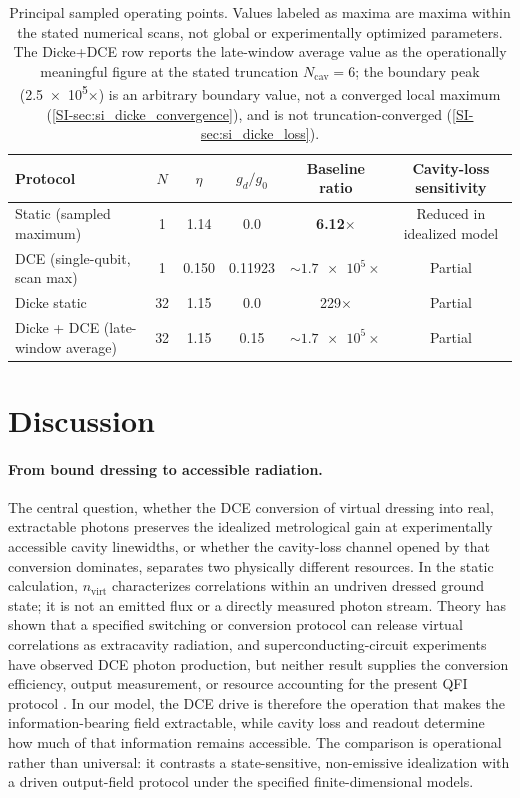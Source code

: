 \documentclass[aps,prxquantum,preprint,superscriptaddress,amsmath,amssymb]{revtex4-2}
\begin{document}
\begin{table}[hbtp]
\centering
\caption{Principal sampled operating points. Values labeled as maxima are maxima within the stated numerical scans, not global or experimentally optimized parameters. The Dicke+DCE row reports the late-window average value as the operationally meaningful figure at the stated truncation $N_{\text{cav}}=\num{6}$; the boundary peak (\num{2.5e5}$\times$) is an arbitrary boundary value, not a converged local maximum (\cref{SI-sec:si_dicke_convergence}), and is not truncation-converged (\cref{SI-sec:si_dicke_loss}).}
\label{tab:trackB_optimal}
\begin{tabular}{l c c c c c}
\toprule
{Protocol} & {$N$} & {$\eta$} & {$g_d/g_0$} & {Baseline ratio} & {Cavity-loss sensitivity} \\
\midrule
Static (sampled maximum) & \num{1} & \num{1.14} & \num{0.0} & \textbf{\num{6.12}$\times$} & Reduced in idealized model \\
DCE (single-qubit, scan max) & \num{1} & \num{0.150} & \num{0.11923} & \textbf{$\sim\!\num{1.7e5}\times$} & Partial \\
Dicke static & \num{32} & \num{1.15} & \num{0.0} & \num{229}$\times$ & Partial \\
Dicke + DCE (late-window average) & \num{32} & \num{1.15} & \num{0.15} & \textbf{$\sim\!\num{1.7e5}\times$} & Partial \\
\bottomrule
\end{tabular}
\end{table}

\section{Discussion}
\label{sec:discussion}

\paragraph{From bound dressing to accessible radiation.}
The central question, whether the DCE conversion of virtual dressing into real, extractable photons preserves the idealized metrological gain at experimentally accessible cavity linewidths, or whether the cavity-loss channel opened by that conversion dominates, separates two physically different resources. In the static calculation, $n_{\text{virt}}$ characterizes correlations within an undriven dressed ground state; it is not an emitted flux or a directly measured photon stream. Theory has shown that a specified switching or conversion protocol can release virtual correlations as extracavity radiation, and superconducting-circuit experiments have observed DCE photon production, but neither result supplies the conversion efficiency, output measurement, or resource accounting for the present QFI protocol \cite{Stassi2013,Garziano2013,Wilson2011,Giannelli2024}. In our model, the DCE drive is therefore the operation that makes the information-bearing field extractable, while cavity loss and readout determine how much of that information remains accessible. The comparison is operational rather than universal: it contrasts a state-sensitive, non-emissive idealization with a driven output-field protocol under the specified finite-dimensional models.
\end{document}
